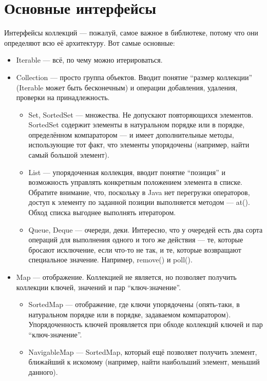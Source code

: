 \documentclass[a5paper]{article}
\begin{document}
\section{Основные интерфейсы}

Интерфейсы коллекций --- пожалуй, самое важное в библиотеке, потому что они определяют всю её архитектуру. Вот самые основные:

\begin{itemize}
	\item Iterable --- всё, по чему можно итерироваться. 
	\item Collection --- просто группа объектов. Вводит понятие ``размер коллекции'' (Iterable может быть бесконечным) и операции добавления, удаления, проверки на принадлежность.
	\begin{itemize}
		\item Set, SortedSet --- множества. Не допускают повторяющихся элементов. SortedSet содержит элементы в натуральном порядке или в порядке, определённом компаратором --- и имеет дополнительные методы, использующие тот факт, что элементы упорядочены (например, найти самый большой элемент).
		\item List --- упорядоченная коллекция, вводит понятие ``позиция'' и возможность управлять конкретным положением элемента в списке. Обратите внимание, что, поскольку в Java нет перегрузки операторов, доступ к элементу по заданной позиции выполняется методом --- at(). Обход списка выгоднее выполнять итератором.
		\item Queue, Deque --- очереди, деки. Интересно, что у очередей есть два сорта операций для выполнения одного и того же действия --- те, которые бросают исключение, если что-то не так, и те, которые возвращают специальное значение. Например, remove() и poll().
	\end{itemize}
	\item Map --- отображение. Коллекцией не является, но позволяет получить коллекции ключей, значений и пар ``ключ-значение''.
	\begin{itemize}
		\item SortedMap --- отображение, где ключи упорядочены (опять-таки, в натуральном порядке или в порядке, задаваемом компаратором). Упорядоченность ключей проявляется при обходе коллекций ключей и пар ``ключ-значение''.
		\item NavigableMap --- SortedMap, который ещё позволяет получить элемент, ближайший к искомому (например, найти наибольший элемент, меньший данного).
	\end{itemize}
\end{itemize}
\end{document}
